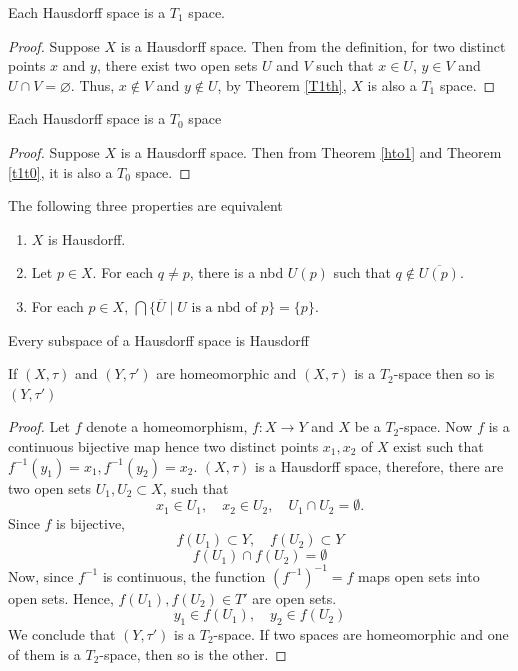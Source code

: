 \documentclass[12pt]{article} %
\begin{document}
\begin{theorem} \parencite{milewski1994topology}
    Each Hausdorff space is a $T_1$ space. \label{hto1}
\end{theorem}
\begin{proof}
    Suppose $X$ is a Hausdorff space. Then from the definition, for two distinct points $x$ and $y$, there exist two open sets $U$ and $V$ such that $x\in U$, $y\in V$ and  $U \cap V = \varnothing$. Thus, $x \notin V$ and $y\notin U$, by Theorem \ref{T1th}, $X$ is also a $T_1$ space.
    
\end{proof}

\begin{theorem}\parencite{milewski1994topology}
    Each Hausdorff space is a $T_0$ space \label{hto}
\end{theorem}
\begin{proof}
    Suppose $X$ is a Hausdorff space. Then from Theorem \ref{hto1} and Theorem \ref{t1t0}, it is also a $T_0$ space.
\end{proof}


\begin{theorem} \parencite{Dugundji1966} The following three properties are equivalent

\begin{enumerate}
    \item $X$ is Hausdorff.
    \item Let $p \in X$. For each $q \ne p$, there is a nbd $U(p)$ such that $q \notin \overline{U(p)}$.
    \item For each $p \in X$, $\bigcap \{ \overline{U} \mid U \text{ is a nbd of } p \} = \{p\}$.
\end{enumerate}

\end{theorem}

\begin{theorem}
    Every subspace of a Hausdorff space is Hausdorff \label{subhaus}
\end{theorem}

\begin{theorem}
  If $(X,\tau)$ and $(Y,\tau')$ are homeomorphic  and $(X,\tau)$ is a $T_2$-space then so is  $(Y,\tau')$ 
\end{theorem}
\begin{proof}
    Let $f$ denote a homeomorphism, $f: X \to Y$ and $X$ be a $T_2$-space. Now $f$ is a continuous bijective map hence two distinct points $x_1,x_2$ of $X$ exist such that $f^{-1}(y_1)=x_1, f^{-1}(y_2)=x_2$. $(X, \tau)$ is a Hausdorff space, therefore, there are two open sets $U_1, U_2 \subset X$, such that
\[ x_1 \in U_1, \quad x_2 \in U_2, \quad U_1 \cap U_2 = \emptyset. \]
Since $f$ is bijective,
\[ f(U_1) \subset Y, \quad f(U_2) \subset Y \]
\[ f(U_1) \cap f(U_2) = \emptyset \]
Now, since $f^{-1}$ is continuous, the function $(f^{-1})^{-1} = f$ maps open sets into open sets. Hence, $f(U_1), f(U_2) \in T'$ are open sets.
\[ y_1 \in f(U_1), \quad y_2 \in f(U_2) \]
We conclude that $(Y, \tau')$ is a $T_2$-space.
If two spaces are homeomorphic and one of them is a $T_2$-space, then so is the other.
\end{proof}
 
\end{document}
